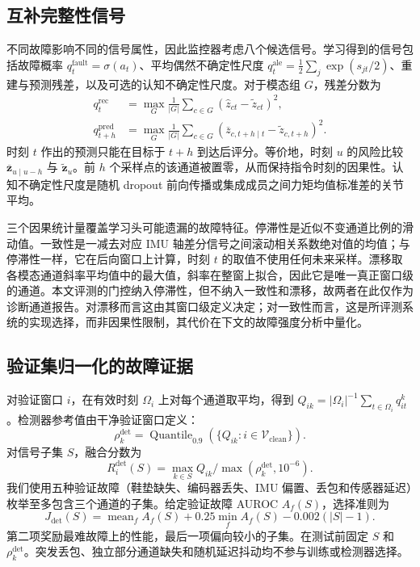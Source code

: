\documentclass[UTF8]{ctexart}
\begin{document}
\subsection{互补完整性信号}

不同故障影响不同的信号属性，因此监控器考虑八个候选信号。学习得到的信号包括故障概率 $q_t^{\mathrm{fault}}=\sigma(a_t)$、平均偶然不确定性尺度 $q_t^{\mathrm{ale}}=\frac{1}{2}\sum_j\exp(s_{jt}/2)$、重建与预测残差，以及可选的认知不确定性尺度。对于模态组 $G$，残差分数为
\begin{align}
q_t^{\mathrm{rec}} &= \max_G\frac{1}{|G|}\sum_{c\in G}
(\widehat z_{ct}-\widetilde z_{ct})^2,\\
q_{t+h}^{\mathrm{pred}} &= \max_G\frac{1}{|G|}\sum_{c\in G}
(\overline z_{c,t+h\mid t}-\widetilde z_{c,t+h})^2.
\end{align}
时刻 $t$ 作出的预测只能在目标于 $t+h$ 到达后评分。等价地，时刻 $u$ 的风险比较 $\overline{\mathbf{z}}_{u\mid u-h}$ 与 $\widetilde{\mathbf{z}}_u$。前 $h$ 个采样点的该通道被置零，从而保持指令时刻的因果性。认知不确定性尺度是随机 dropout 前向传播或集成成员之间力矩均值标准差的关节平均。

三个因果统计量覆盖学习头可能遗漏的故障特征。停滞性是近似不变通道比例的滑动值。一致性是一减去对应 IMU 轴差分信号之间滚动相关系数绝对值的均值；与停滞性一样，它在后向窗口上计算，时刻 $t$ 的取值不使用任何未来采样。漂移取各模态通道斜率平均值中的最大值，斜率在整窗上拟合，因此它是唯一真正窗口级的通道。本文评测的门控纳入停滞性，但不纳入一致性和漂移，故两者在此仅作为诊断通道报告。对漂移而言这由其窗口级定义决定；对一致性而言，这是所评测系统的实现选择，而非因果性限制，其代价在下文的故障强度分析中量化。

\subsection{验证集归一化的故障证据}

对验证窗口 $i$，在有效时刻 $\Omega_i$ 上对每个通道取平均，得到 $Q_{ik}=|\Omega_i|^{-1}\sum_{t\in\Omega_i}q_{it}^{k}$。检测器参考值由干净验证窗口定义：
\begin{equation}
    \rho_k^{\mathrm{det}}=\operatorname{Quantile}_{0.9}
    \left(\{Q_{ik}:i\in\mathcal{V}_{\mathrm{clean}}\}\right).
\end{equation}
对信号子集 $S$，融合分数为
\begin{equation}
    R_i^{\mathrm{det}}(S) = \max_{k\in S}
    Q_{ik}/\max(\rho_k^{\mathrm{det}},10^{-6}).
\end{equation}
我们使用五种验证故障（鞋垫缺失、编码器丢失、IMU 偏置、丢包和传感器延迟）枚举至多包含三个通道的子集。给定验证故障 AUROC $A_f(S)$，选择准则为
\begin{equation}
    J_{\mathrm{det}}(S)=\operatorname{mean}_f A_f(S)
    +0.25\min_f A_f(S)-0.002(|S|-1).
\end{equation}
第二项奖励最难故障上的性能，最后一项偏向较小的子集。在测试前固定 $S$ 和 $\rho_k^{\mathrm{det}}$。突发丢包、独立部分通道缺失和随机延迟抖动均不参与训练或检测器选择。
\end{document}

